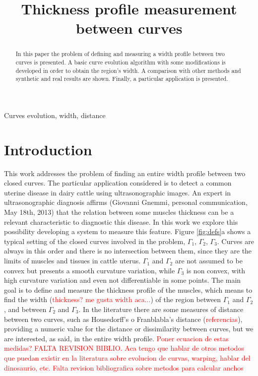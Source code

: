 \documentclass{article}
\title{Thickness profile measurement between curves}
\begin{document}
\maketitle

\begin{abstract}
In this paper the problem of defining and measuring a width profile between two curves is presented. A basic curve evolution algorithm with some modifications is developed in order to obtain the region's width. A comparison with other methods and synthetic and real results are shown. Finally, a particular application is presented.
\end{abstract}

\begin{keywords}
Curves evolution, width, distance
\end{keywords}

\section{Introduction}
\label{sec:intro}
This work addresses the problem of finding an entire width profile between two closed curves. The particular application considered is to detect a common uterine disease in dairy cattle using ultrasonographic images. An expert in ultrasonographic diagnosis affirms (Giovanni Gnemmi, personal communication, May 18th, 2013) that the relation between some muscles thickness can be a relevant characteristic to diagnostic this disease. In this work we explore this possibility developing a system to measure this feature. Figure \ref{fig:defs}a shows a typical setting of the closed curves involved in the problem, $\Gamma_1$, $\Gamma_2$, $\Gamma_3$. Curves are always in this order and there is no intersection between them, since they are the limits of muscles and tissues in cattle uterus. $\Gamma_1$ and $\Gamma_2$ are not assumed to be convex but presents a smooth curvature variation, while $\Gamma_3$ is non convex, with high curvature variation and even not differentiable in some points. The main goal is to define and measure the thickness profile of the muscles, which means to find the width (\textcolor{red}{thickness? me gusta width aca...}) of the region between $\Gamma_1$ and $\Gamma_2$, and between $\Gamma_2$ and $\Gamma_3$. In the literature there are some measures of distance between two curves, such as Housedorff's o Franblabla's distance (\textcolor{red}{referencias}), providing a numeric value for the distance or dissimilarity between curves, but we are interested, as said, in the entire width profile. \textcolor{red}{Poner ecuacion de estas medidas?    FALTA REVISION BIBLIO. Aca tengo que hablar de otros metodos que puedan existir en la literatura sobre evolucion de curvas, warping, hablar del dinosaurio, etc. Falta revision bibliografica sobre metodos para calcular anchos}
\\
\end{document}
